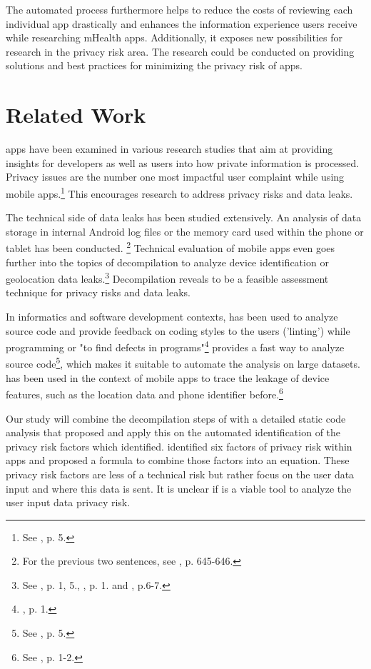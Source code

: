 \documentclass[
	a4paper,
	oneside,
	12pt,
	liststotocnumbered
]{article}
\let\cite\textcite
\begin{document}
The automated process furthermore helps to reduce the costs of reviewing each individual app drastically and enhances the information experience users receive while researching mHealth apps.
Additionally, it exposes new possibilities for research in the privacy risk area. The research could be conducted on providing solutions and best practices for minimizing the privacy risk of apps.

\section{Related Work}
\mH apps have been examined in various research studies that aim at providing insights for developers as well as users into how private information is processed.
Privacy issues are the number one most impactful user complaint while using mobile apps.\footnote{See \cite{Khalid2015}, p. 5.}
This encourages research to address privacy risks and data leaks.

The technical side of data leaks has been studied extensively. 
An analysis of \mH data storage in internal Android log files or the memory card used within the phone or tablet has been conducted. \footnote{For the previous two sentences, see \cite{He2014}, p. 645-646.}
Technical evaluation of mobile apps even goes further into the topics of decompilation to analyze device identification or geolocation data leaks.\footnote{See \cite{Mcclurg2012}, p. 1, 5., \cite{Enck2011}, p. 1. and \cite{Mitchell2013}, p.6-7.}
Decompilation reveals to be a feasible assessment technique for privacy risks and data leaks.

In informatics and software development contexts, \sca has been used to analyze source code and provide feedback on coding styles to the users ('linting') while programming or "to find defects in programs"\footnote{\cite{Bardas2010}, p. 1.}
\Sca provides a fast way to analyze source code\footnote{See \cite{Bardas2010}, p. 5.}, which makes it suitable to automate the analysis on large datasets.
\Sca has been used in the context of mobile apps to trace the leakage of device features, such as the location data and phone identifier before.\footnote{See \cite{Kim2012}, p. 1-2.}

Our study will combine the decompilation steps of \cite{Enck2011} with a detailed static code analysis that \cite{Kim2012} proposed and apply this on the automated identification of the privacy risk factors which \cite{Bruggemann2016} identified.
\cite{Bruggemann2016} identified six factors of privacy risk within \mH apps and proposed a formula to combine those factors into an equation.
These privacy risk factors are less of a technical risk but rather focus on the user data input and where this data is sent.
It is unclear if \sca is a viable tool to analyze the user input data privacy risk.
\end{document}
